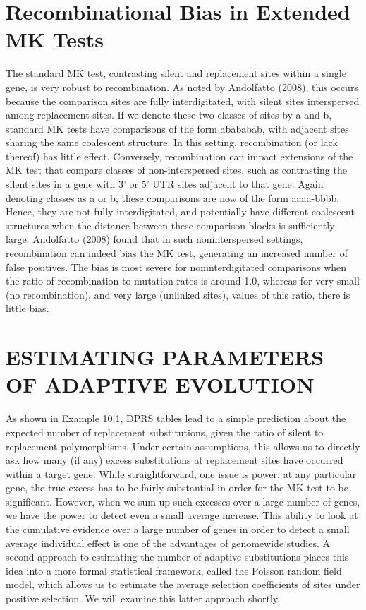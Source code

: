 \documentclass{article}
\begin{document}
\section{Recombinational Bias in Extended MK Tests}
The standard MK test, contrasting silent and replacement sites within a single gene, is very robust to recombination. As noted by Andolfatto (2008), this occurs because the comparison sites are fully interdigitated, with silent sites interspersed among replacement sites. If we denote these two classes of sites by a and b, standard MK tests have comparisons of the form abababab, with adjacent sites sharing the same coalescent structure. In this setting, recombination (or lack thereof) has little effect. Conversely, recombination can impact extensions of the MK test that compare classes of non-interspersed sites, such as contrasting the silent sites in a gene with 3' or 5' UTR sites adjacent to that gene. Again denoting classes as a or b, these comparisons are now of the form aaaa-bbbb. Hence, they are not fully interdigitated, and potentially have different coalescent structures when the distance between these comparison blocks is sufficiently large. Andolfatto (2008) found that in such noninterspersed settings, recombination can indeed bias the MK test, generating an increased number of false positives. The bias is most severe for noninterdigitated comparisons when the ratio of recombination to mutation rates is around 1.0, whereas for very small (no recombination), and very large (unlinked sites), values of this ratio, there is little bias.

\section{ESTIMATING PARAMETERS OF ADAPTIVE EVOLUTION}
As shown in Example 10.1, DPRS tables lead to a simple prediction about the expected number of replacement substitutions, given the ratio of silent to replacement polymorphisms. Under certain assumptions, this allows us to directly ask how many (if any) excess substitutions at replacement sites have occurred within a target gene. While straightforward, one issue is power: at any particular gene, the true excess has to be fairly substantial in order for the MK test to be significant. However, when we sum up such excesses over a large number of genes, we have the power to detect even a small average increase. This ability to look at the cumulative evidence over a large number of genes in order to detect a small average individual effect is one of the advantages of genomewide studies. A second approach to estimating the number of adaptive substitutions places this idea into a more formal statistical framework, called the Poisson random field model, which allows us to estimate the average selection coefficients of sites under positive selection. We will examine this latter approach shortly.
\end{document}
